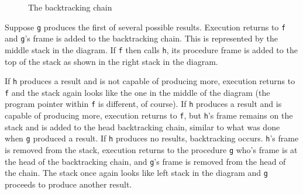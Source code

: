 \begin{figure}[htb]
{

\par}
\caption{The backtracking chain}
\end{figure}

Suppose \texttt{g} produces the first of several possible
results. Execution returns to \texttt{f} and \texttt{g}'s frame is
added to the backtracking chain. This is represented by the middle
stack in the diagram. If \texttt{f} then calls \texttt{h}, its
procedure frame is added to the top of the stack as shown in the right
stack in the diagram.

If \texttt{h} produces a result and is not capable of producing more,
execution returns to \texttt{f} and the stack again looks like the one
in the middle of the diagram (the program pointer within \texttt{f} is
different, of course). If \texttt{h} produces a result and is capable
of producing more, execution returns to \texttt{f}, but \texttt{h}'s
frame remains on the stack and is added to the head backtracking
chain, similar to what was done when \texttt{g} produced a result.
If \texttt{h} produces no results, backtracking occurs.  \texttt{h}'s
frame is removed from the stack, execution returns to the
procedure \texttt{g} who's frame is at the head of the backtracking
chain, and \texttt{g}'s frame is removed from the head of the
chain. The stack once again looks like left stack in the diagram
and \texttt{g} proceeds to produce another result.


